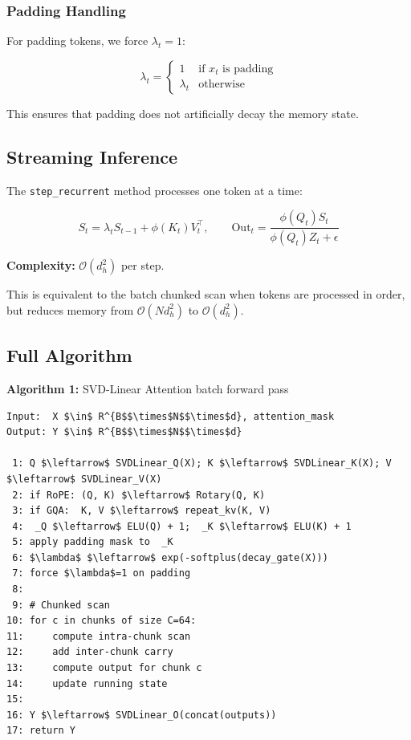\subsubsection{Padding Handling}

For padding tokens, we force $\lambda_t = 1$:

\[
\lambda_t = \begin{cases} 1 & \text{if } x_t \text{ is padding} \\ \lambda_t & \text{otherwise} \end{cases}
\tag{4.15}
\]

This ensures that padding does not artificially decay the memory state.

\subsection{Streaming Inference}

The \texttt{step\_recurrent} method processes one token at a time:

\[
S_t = \lambda_t S_{t-1} + \phi(K_t) V_t^\top, \qquad
\text{Out}_t = \frac{\phi(Q_t) S_t}{\phi(Q_t) Z_t + \epsilon}
\tag{4.16}
\]

\textbf{Complexity:} $\mathcal{O}(d_h^2)$ per step.

This is equivalent to the batch chunked scan when tokens are processed in 
order, but reduces memory from $\mathcal{O}(N d_h^2)$ to $\mathcal{O}(d_h^2)$.

\subsection{Full Algorithm}

\textbf{Algorithm 1:} SVD-Linear Attention batch forward pass
\begin{lstlisting}
Input:  X $\in$ R^{B$$\times$N$$\times$d}, attention_mask
Output: Y $\in$ R^{B$$\times$N$$\times$d}

 1: Q $\leftarrow$ SVDLinear_Q(X); K $\leftarrow$ SVDLinear_K(X); V $\leftarrow$ SVDLinear_V(X)
 2: if RoPE: (Q, K) $\leftarrow$ Rotary(Q, K)
 3: if GQA:  K, V $\leftarrow$ repeat_kv(K, V)
 4:  _Q $\leftarrow$ ELU(Q) + 1;  _K $\leftarrow$ ELU(K) + 1
 5: apply padding mask to  _K
 6: $\lambda$ $\leftarrow$ exp(-softplus(decay_gate(X)))
 7: force $\lambda$=1 on padding
 8:
 9: # Chunked scan
10: for c in chunks of size C=64:
11:     compute intra-chunk scan
12:     add inter-chunk carry
13:     compute output for chunk c
14:     update running state
15:
16: Y $\leftarrow$ SVDLinear_O(concat(outputs))
17: return Y
\end{lstlisting}

